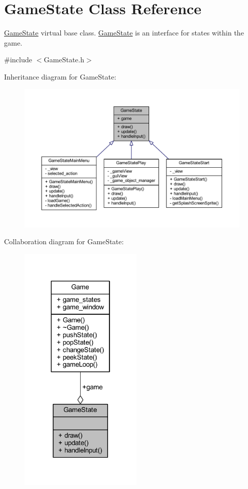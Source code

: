 \hypertarget{class_game_state}{\section{Game\+State Class Reference}
\label{class_game_state}
}


\hyperlink{class_game_state}{Game\+State} virtual base class. \hyperlink{class_game_state}{Game\+State} is an interface for states within the game.  




{\ttfamily \#include $<$Game\+State.\+h$>$}



Inheritance diagram for Game\+State\+:
\nopagebreak
\begin{figure}[H]
\begin{center}
\leavevmode
\includegraphics[width=350pt]{class_game_state__inherit__graph}
\end{center}
\end{figure}


Collaboration diagram for Game\+State\+:
\nopagebreak
\begin{figure}[H]
\begin{center}
\leavevmode
\includegraphics[width=166pt]{class_game_state__coll__graph}
\end{center}
\end{figure}

